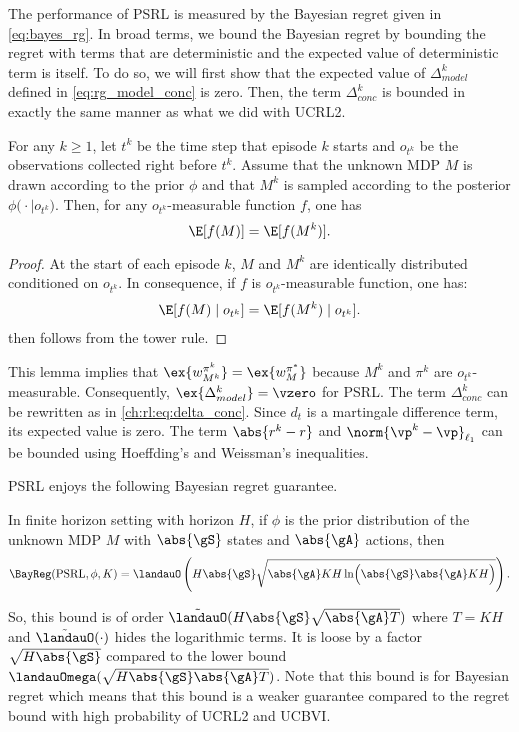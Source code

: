 The performance of PSRL is measured by the Bayesian regret given in \eqref{eq:bayes_rg}.
In broad terms, we bound the Bayesian regret by bounding the regret with terms that are deterministic and the expected value of deterministic term is itself.
To do so, we will first show that the expected value of $\Delta^k_{model}$ defined in \eqref{eq:rg_model_conc} is zero.
Then, the term $\Delta^k_{conc}$ is bounded in exactly the same manner as what we did with UCRL2.
\begin{lem}
    \label{lem:expected_identity}
    For any $k\ge1$, let $t^k$ be the time step that episode $k$ starts and $o_{t^k}$ be the observations collected right before $t^k$.
    Assume that the unknown MDP $M$ is drawn according to the prior $\phi$ and that $M^k$ is sampled according to the posterior $\phi\bigl(\cdot\mid o_{t^k}\bigr)$. Then, for any $o_{t^k}$-measurable function $f$, one has
    \begin{equation}
        \label{eq:exp_iden}
        \E[f(M)] =\E[f(M^k)].
    \end{equation}
\end{lem}
\begin{proof}
    At the start of each episode $k$, $M$ and $M^k$ are identically distributed conditioned on $o_{t^k}$.
    In consequence, if $f$ is $o_{t^k}$-measurable function, one has:
    \begin{align*}    
        \E[f(M) \mid o_{t^k}] =\E[f(M^k) \mid o_{t^k}].
    \end{align*}
     then follows from the tower rule.
\end{proof}
This lemma implies that $\ex{w^{\pi^k}_{M^k}}=\ex{w^{\pi^*}_M}$ because $M^k$ and $\pi^k$ are $o_{t^k}$-measurable.
Consequently, $\ex{\Delta^k_{model}}=\vzero$ for PSRL.
The term $\Delta^k_{conc}$ can be rewritten as in \eqref{ch:rl:eq:delta_conc}.
Since $d_t$ is a martingale difference term, its expected value is zero.
The term $\abs{r^k-r}$ and $\norm{\vp^k-\vp}_{\ell_1}$ can be bounded using Hoeffding's and Weissman's inequalities.

PSRL enjoys the following Bayesian regret guarantee.
\begin{prop}
    \label{prop:brg_psrl}
    In finite horizon setting with horizon $H$, if $\phi$ is the prior distribution of the unknown MDP $M$ with $\abs{\gS}$ states and $\abs{\gA}$ actions, then
    \begin{equation}
        \label{eq:brg_psrl}
        \BayReg(\mathrm{PSRL}, \phi, K) = \landauO\left(H\abs{\gS}\sqrt{\abs{\gA}KH\ln\Bigl(\abs{\gS}\abs{\gA}KH\Bigr)}\right).
    \end{equation}
\end{prop}
So, this bound is of order $\tilde{\landauO}(H\abs{\gS}\sqrt{\abs{\gA}T})$ where $T=KH$ and $\tilde{\landauO}(\cdot)$ hides the logarithmic terms.
It is loose by a factor $\sqrt{H\abs{\gS}}$ compared to the lower bound $\landauOmega(\sqrt{H\abs{\gS}\abs{\gA}T})$.
Note that this bound is for Bayesian regret which means that this bound is a weaker guarantee compared to the regret bound with high probability of UCRL2 and UCBVI.

